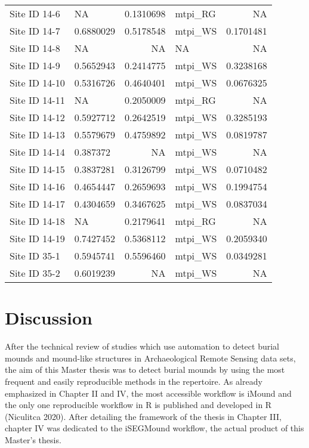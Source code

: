 \documentclass[
]{article}
\begin{document}
\begin{longtable}[t]{llrlr}
Site ID 14-6 & NA & 0.1310698 & mtpi\_RG & NA\\
\addlinespace
Site ID 14-7 & 0.6880029 & 0.5178548 & mtpi\_WS & 0.1701481\\
Site ID 14-8 & NA & NA & NA & NA\\
Site ID 14-9 & 0.5652943 & 0.2414775 & mtpi\_WS & 0.3238168\\
Site ID 14-10 & 0.5316726 & 0.4640401 & mtpi\_WS & 0.0676325\\
Site ID 14-11 & NA & 0.2050009 & mtpi\_RG & NA\\
\addlinespace
Site ID 14-12 & 0.5927712 & 0.2642519 & mtpi\_WS & 0.3285193\\
Site ID 14-13 & 0.5579679 & 0.4759892 & mtpi\_WS & 0.0819787\\
Site ID 14-14 & 0.387372 & NA & mtpi\_WS & NA\\
Site ID 14-15 & 0.3837281 & 0.3126799 & mtpi\_WS & 0.0710482\\
Site ID 14-16 & 0.4654447 & 0.2659693 & mtpi\_WS & 0.1994754\\
\addlinespace
Site ID 14-17 & 0.4304659 & 0.3467625 & mtpi\_WS & 0.0837034\\
Site ID 14-18 & NA & 0.2179641 & mtpi\_RG & NA\\
Site ID 14-19 & 0.7427452 & 0.5368112 & mtpi\_WS & 0.2059340\\
Site ID 35-1 & 0.5945741 & 0.5596460 & mtpi\_WS & 0.0349281\\
Site ID 35-2 & 0.6019239 & NA & mtpi\_WS & NA\\
\bottomrule
\end{longtable}

\newpage

\hypertarget{discussion}{%
\section{Discussion}\label{discussion}}

After the technical review of studies which use automation to detect burial mounds and mound-like structures in Archaeological Remote Sensing data sets, the aim of this Master thesis was to detect burial mounds by using the most frequent and easily reproducible methods in the repertoire. As already emphasized in Chapter II and IV, the most accessible workflow is iMound and the only one reproducible workflow in R is published and developed in R (Niculitca 2020). After detailing the framework of the thesis in Chapter III, chapter IV was dedicated to the iSEGMound workflow, the actual product of this Master's thesis.
\end{document}
